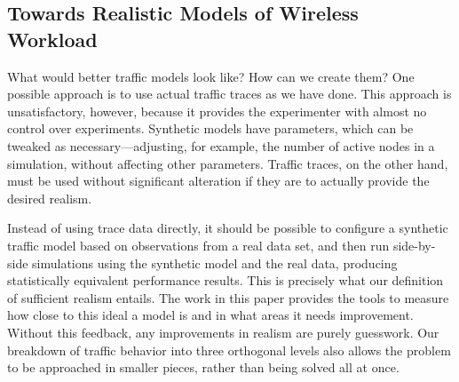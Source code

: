 \documentclass[conference]{IEEEtran}
\begin{document}
\subsection{Towards Realistic Models of Wireless Workload}

What would better traffic models look like? How can we create them? One possible approach is to use actual traffic traces as we have done. This approach is unsatisfactory, however, because it provides the experimenter with almost no control over experiments. Synthetic models have parameters, which can be tweaked as necessary---adjusting, for example, the number of active nodes in a simulation, without affecting other parameters. Traffic traces, on the other hand, must be used without significant alteration if they are to actually provide the desired realism. %

Instead of using trace data directly, it should be possible to configure a synthetic traffic model based on observations from a real data set, and then run side-by-side simulations using the synthetic model and the real data, producing statistically equivalent performance results. This is precisely what our definition of sufficient realism entails. The work in this paper provides the tools to measure how close to this ideal a model is and in what areas it needs improvement. Without this feedback, any improvements in realism are purely guesswork. Our breakdown of traffic behavior into three orthogonal levels also allows the problem to be approached in smaller pieces, rather than being solved all at once.

\end{document}
